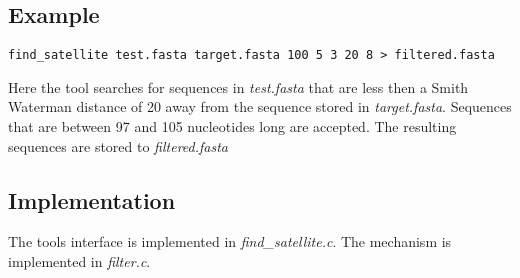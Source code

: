 \subsection{Example}
\begin{lstlisting}
find_satellite test.fasta target.fasta 100 5 3 20 8 > filtered.fasta
\end{lstlisting}
Here the tool searches for sequences in \emph{test.fasta} that are
less then a Smith Waterman distance of 20 away from the sequence
stored in \emph{target.fasta}. Sequences that are between 97 and 105
nucleotides long are accepted. The resulting sequences are stored to
\emph{filtered.fasta}

\subsection{Implementation}
The tools interface is implemented in \emph{find\_satellite.c}. The
mechanism is implemented in \emph{filter.c}.


    
